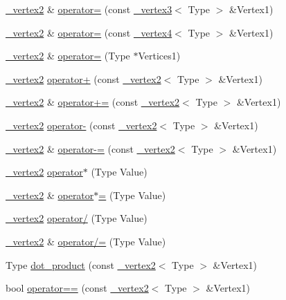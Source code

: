 \begin{DoxyCompactItemize}
\item 
\hyperlink{class__vertex2}{\+\_\+vertex2} \& \hyperlink{class__vertex2_a99100f6414212d660b47ef757fbda530}{operator=} (const \hyperlink{class__vertex3}{\+\_\+vertex3}$<$ Type $>$ \&Vertex1)
\item 
\hyperlink{class__vertex2}{\+\_\+vertex2} \& \hyperlink{class__vertex2_a721bced51179d5eb8e4f2b55d6575cbf}{operator=} (const \hyperlink{class__vertex4}{\+\_\+vertex4}$<$ Type $>$ \&Vertex1)
\item 
\hyperlink{class__vertex2}{\+\_\+vertex2} \& \hyperlink{class__vertex2_a93c58d5bf73deaaa373529db52c86279}{operator=} (Type $\ast$Vertices1)
\item 
\hyperlink{class__vertex2}{\+\_\+vertex2} \hyperlink{class__vertex2_ae1910f3f68a0d24611ff0d6d266ee58b}{operator+} (const \hyperlink{class__vertex2}{\+\_\+vertex2}$<$ Type $>$ \&Vertex1)
\item 
\hyperlink{class__vertex2}{\+\_\+vertex2} \& \hyperlink{class__vertex2_ae16f5ae01aa44a8564abba7d2a45f403}{operator+=} (const \hyperlink{class__vertex2}{\+\_\+vertex2}$<$ Type $>$ \&Vertex1)
\item 
\hyperlink{class__vertex2}{\+\_\+vertex2} \hyperlink{class__vertex2_a83231d384db1e1da9630e96296202cfc}{operator-\/} (const \hyperlink{class__vertex2}{\+\_\+vertex2}$<$ Type $>$ \&Vertex1)
\item 
\hyperlink{class__vertex2}{\+\_\+vertex2} \& \hyperlink{class__vertex2_a5268d2764acca259d8d4f1258fa75ae4}{operator-\/=} (const \hyperlink{class__vertex2}{\+\_\+vertex2}$<$ Type $>$ \&Vertex1)
\item 
\hyperlink{class__vertex2}{\+\_\+vertex2} \hyperlink{class__vertex2_aab7c18e4b66c030ea673d95dd02b3166}{operator$\ast$} (Type Value)
\item 
\hyperlink{class__vertex2}{\+\_\+vertex2} \& \hyperlink{class__vertex2_a30996bf8e5b2791fd100614376843c7c}{operator$\ast$=} (Type Value)
\item 
\hyperlink{class__vertex2}{\+\_\+vertex2} \hyperlink{class__vertex2_a8d881ad9953a6f3239eae673357668b1}{operator/} (Type Value)
\item 
\hyperlink{class__vertex2}{\+\_\+vertex2} \& \hyperlink{class__vertex2_af5073a4eadd0a45ca1ba87c0e2f3ae3c}{operator/=} (Type Value)
\item 
Type \hyperlink{class__vertex2_aec1d371dfc0e540cc26f926f21554826}{dot\+\_\+product} (const \hyperlink{class__vertex2}{\+\_\+vertex2}$<$ Type $>$ \&Vertex1)
\item 
bool \hyperlink{class__vertex2_a557b9518ccdd4534e246770f73a7e556}{operator==} (const \hyperlink{class__vertex2}{\+\_\+vertex2}$<$ Type $>$ \&Vertex1)

\end{DoxyCompactItemize}
